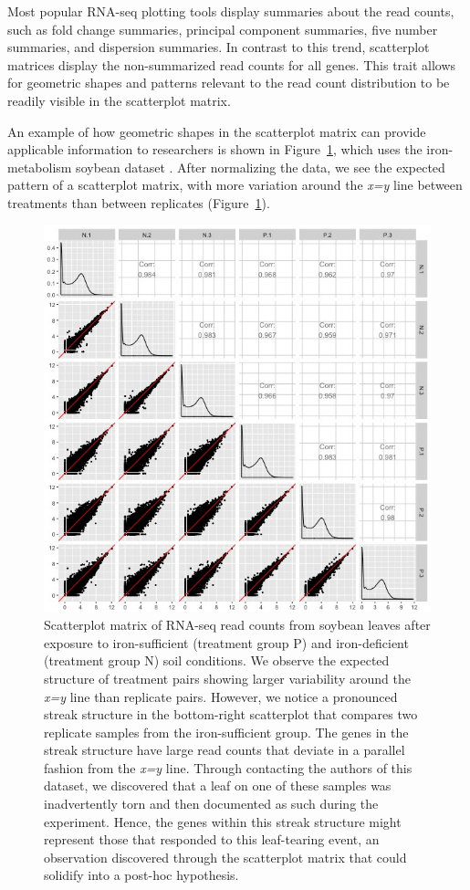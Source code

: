 \documentclass{bioinfo}
\begin{document}
Most popular RNA-seq plotting tools display summaries about the read counts, such as fold change summaries, principal component summaries, five number summaries, and dispersion summaries. In contrast to this trend, scatterplot matrices display the non-summarized read counts for all genes. This trait allows for geometric shapes and patterns relevant to the read count distribution to be readily visible in the scatterplot matrix.

An example of how geometric shapes in the scatterplot matrix can provide applicable information to researchers is shown in Figure~\ref{structure}, which uses the iron-metabolism soybean dataset \citep{Lauter}. After normalizing the data, we see the expected pattern of a scatterplot matrix, with more variation around the \textit{x=y} line between treatments than between replicates (Figure~\ref{structure}). 

\begin{figure}[!tpb]
\centerline{\includegraphics[width=\columnwidth]{../Bioinformatics/Pictures/soybeanStreak/N_P_points.jpg}}
\caption{Scatterplot matrix of RNA-seq read counts from soybean leaves after exposure to iron-sufficient (treatment group P) and iron-deficient (treatment group N) soil conditions. We observe the expected structure of treatment pairs showing larger variability around the \textit{x=y} line than replicate pairs. However, we notice a pronounced streak structure in the bottom-right scatterplot that compares two replicate samples from the iron-sufficient group. The genes in the streak structure have large read counts that deviate in a parallel fashion from the \textit{x=y} line. Through contacting the authors of this dataset, we discovered that a leaf on one of these samples was inadvertently torn and then documented as such during the experiment. Hence, the genes within this streak structure might represent those that responded to this leaf-tearing event, an observation discovered through the scatterplot matrix that could solidify into a post-hoc hypothesis.
\label{structure}}
\end{figure}
\end{document}
